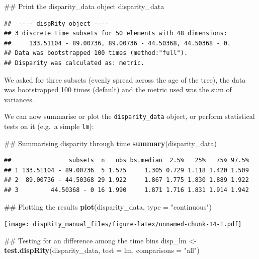 \documentclass[]{book}
\newenvironment{Shaded}{\begin{snugshade}}{\end{snugshade}}
\newcommand{\KeywordTok}[1]{\textcolor[rgb]{0.13,0.29,0.53}{\textbf{#1}}}
\newcommand{\DataTypeTok}[1]{\textcolor[rgb]{0.13,0.29,0.53}{#1}}
\newcommand{\StringTok}[1]{\textcolor[rgb]{0.31,0.60,0.02}{#1}}
\newcommand{\NormalTok}[1]{#1}
\theoremstyle{definition}
\theoremstyle{definition}
\theoremstyle{remark}
\begin{document}
\begin{Shaded}
\begin{Highlighting}[]
\NormalTok{## Print the disparity_data object}
\NormalTok{disparity_data}
\end{Highlighting}
\end{Shaded}

\begin{verbatim}
##  ---- dispRity object ---- 
## 3 discrete time subsets for 50 elements with 48 dimensions:
##     133.51104 - 89.00736, 89.00736 - 44.50368, 44.50368 - 0.
## Data was bootstrapped 100 times (method:"full").
## Disparity was calculated as: metric.
\end{verbatim}

We asked for three subsets (evenly spread across the age of the tree),
the data was bootstrapped 100 times (default) and the metric used was
the sum of variances.

We can now summarise or plot the \texttt{disparity\_data} object, or
perform statistical tests on it (e.g.~a simple \texttt{lm}):

\begin{Shaded}
\begin{Highlighting}[]
\NormalTok{## Summarising disparity through time}
\KeywordTok{summary}\NormalTok{(disparity_data)}
\end{Highlighting}
\end{Shaded}

\begin{verbatim}
##                subsets  n   obs bs.median  2.5%   25%   75% 97.5%
## 1 133.51104 - 89.00736  5 1.575     1.305 0.729 1.118 1.420 1.509
## 2  89.00736 - 44.50368 29 1.922     1.867 1.775 1.830 1.889 1.922
## 3         44.50368 - 0 16 1.990     1.871 1.716 1.831 1.914 1.942
\end{verbatim}

\begin{Shaded}
\begin{Highlighting}[]
\NormalTok{## Plotting the results}
\KeywordTok{plot}\NormalTok{(disparity_data, }\DataTypeTok{type =} \StringTok{"continuous"}\NormalTok{)}
\end{Highlighting}
\end{Shaded}

\texttt{[image: dispRity\_manual\_files/figure-latex/unnamed-chunk-14-1.pdf]}

\begin{Shaded}
\begin{Highlighting}[]
\NormalTok{## Testing for an difference among the time bins}
\NormalTok{disp_lm <-}\StringTok{ }\KeywordTok{test.dispRity}\NormalTok{(disparity_data, }\DataTypeTok{test =}\NormalTok{ lm, }\DataTypeTok{comparisons =} \StringTok{"all"}\NormalTok{)}
\end{Highlighting}
\end{Shaded}
\end{document}
